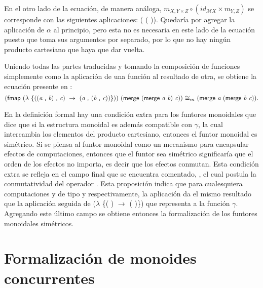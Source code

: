 En el otro lado de la ecuación, de manera análoga, $m_{X, Y \times Z} \circ (id_{\mathcal{M}X} \times m_{Y,Z})$ se corresponde con las siguientes aplicaciones: (  ( )). Quedaría por agregar la aplicación de $\alpha$ al principio, pero esta no es necesaria en este lado de la ecuación puesto que  toma sus argumentos por separado, por lo que no hay ningún producto cartesiano que haya que dar vuelta.

Uniendo todas las partes traducidas y tomando la composición de funciones simplemente como la aplicación de una función al resultado de otra, se obtiene la ecuación presente en :
\begin{equation*}
(\AgdaField{fmap} \ (\lambda \ \{((\AgdaBound{a} \ \AgdaInductiveConstructor{,} \ \AgdaBound{b}) \ \AgdaInductiveConstructor{,} \ \AgdaBound{c}) \ \rightarrow \ (\AgdaBound{a} \ \AgdaInductiveConstructor{,} \ (\AgdaBound{b} \ \AgdaInductiveConstructor{,} \ \AgdaBound{c}))\})) \ (\AgdaField{merge} \ (\AgdaField{merge} \ \AgdaBound{a b}) \  \AgdaBound{c})) \ \AgdaField{$\cong_m$} \ (\AgdaField{merge} \ \AgdaBound{a} \ (\AgdaField{merge} \ \AgdaBound{b c})).
\end{equation*}

En la definición formal hay una condición extra para los funtores monoidales que dice que si la estructura monoidal es además compatible con $\gamma$, la cual intercambia los elementos del producto cartesiano, entonces el funtor monoidal es simétrico. Si se piensa al funtor monoidal como un mecanismo para encapsular efectos de computaciones, entonces que el funtor sea simétrico significaría que el orden de los efectos no importa, es decir que los efectos conmutan. Esta condición extra se refleja en el campo final que se encuentra comentado, , el cual postula la conmutatividad del operador . Esta proposición indica que para cualesquiera computaciones  y  de tipo  y  respectivamente, la aplicación   da el mismo resultado que la aplicación   seguida de ($\lambda$ \{( \AgdaInductiveConstructor{,} ) $\rightarrow$ ( \AgdaInductiveConstructor{,} )\}) que representa a la función $\gamma$. Agregando este último campo se obtiene entonces la formalización de los funtores monoidales simétricos.

\section{Formalización de monoides concurrentes}\label{form:monoidconc}

